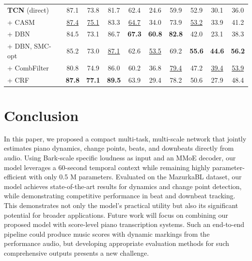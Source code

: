 \documentclass{article}
\begin{document}
\begin{table}[t]
{\begin{tabular}{l|ccc|ccc|ccc}
\midrule
\textbf{TCN} (direct) \cite{bock2020deconstruct}
& 87.1 & 73.8 & 81.7
& 62.4 & 24.6 & 59.9
& 52.9 & 30.1 & 36.0 \\
\rowcolor{gray!10}
\quad + CASM 
& \underline{87.4} & \underline{75.1} & 83.3
& \underline{64.7} & 34.0 & 73.9
& \underline{53.2} & 33.9 & 41.2 \\
\quad + DBN
& 84.5 & 73.1 & 86.7
& \textbf{67.3} & \textbf{60.8} & \textbf{82.8}
& 42.0 & 23.1 & 38.3 \\
\quad + DBN, SMC-opt
& 85.2 & 73.0 & \underline{87.1}
& 62.6 & \underline{53.5} & 69.2
& \textbf{55.6} & \textbf{44.6} & \textbf{56.2} \\
\quad + CombFilter
& 80.8 & 74.9 & 86.0
& 60.2 & 36.8 & \underline{79.4}
& 47.2 & \underline{39.4} & \underline{53.9} \\
\quad + CRF
& \textbf{87.8} & \textbf{77.1} & \textbf{89.5}
& 63.9 & 29.4 & 78.2
& 50.6 & 27.9 & 48.4 \\
\bottomrule
\end{tabular}%
}
\endgroup
\end{table}

\section{Conclusion}
\label{sec:concl}
In this paper, we proposed a compact multi-task, multi-scale network that jointly estimates piano dynamics, change points, beats, and downbeats directly from audio. Using Bark-scale specific loudness as input and an MMoE decoder, our model leverages a 60-second temporal context while remaining highly parameter-efficient with only 0.5 M parameters. Evaluated on the MazurkaBL dataset, our model achieves state-of-the-art results for dynamics and change point detection, while demonstrating competitive performance in beat and downbeat tracking. This demonstrates not only the model's practical utility but also its significant potential for broader applications. Future work will focus on combining our proposed model with score-level piano transcription systems. Such an end-to-end pipeline could produce music scores with dynamic markings from the performance audio, but developing appropriate evaluation methods for such comprehensive outputs presents a new challenge.

\end{document}
